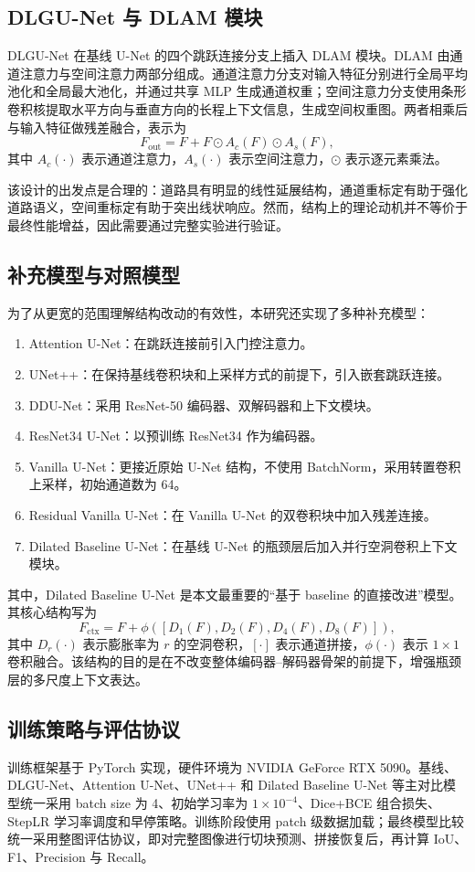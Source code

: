 \documentclass[12pt,a4paper]{ctexart}
\begin{document}
\subsection{DLGU-Net 与 DLAM 模块}
DLGU-Net 在基线 U-Net 的四个跳跃连接分支上插入 DLAM 模块。DLAM 由通道注意力与空间注意力两部分组成。通道注意力分支对输入特征分别进行全局平均池化和全局最大池化，并通过共享 MLP 生成通道权重；空间注意力分支使用条形卷积核提取水平方向与垂直方向的长程上下文信息，生成空间权重图。两者相乘后与输入特征做残差融合，表示为
\[
F_{\text{out}} = F + F \odot A_c(F) \odot A_s(F),
\]
其中 $A_c(\cdot)$ 表示通道注意力，$A_s(\cdot)$ 表示空间注意力，$\odot$ 表示逐元素乘法。

该设计的出发点是合理的：道路具有明显的线性延展结构，通道重标定有助于强化道路语义，空间重标定有助于突出线状响应。然而，结构上的理论动机并不等价于最终性能增益，因此需要通过完整实验进行验证。

\subsection{补充模型与对照模型}
为了从更宽的范围理解结构改动的有效性，本研究还实现了多种补充模型：
\begin{enumerate}
    \item Attention U-Net：在跳跃连接前引入门控注意力。
    \item UNet++：在保持基线卷积块和上采样方式的前提下，引入嵌套跳跃连接。
    \item DDU-Net：采用 ResNet-50 编码器、双解码器和上下文模块。
    \item ResNet34 U-Net：以预训练 ResNet34 作为编码器。
    \item Vanilla U-Net：更接近原始 U-Net 结构，不使用 BatchNorm，采用转置卷积上采样，初始通道数为 64。
    \item Residual Vanilla U-Net：在 Vanilla U-Net 的双卷积块中加入残差连接。
    \item Dilated Baseline U-Net：在基线 U-Net 的瓶颈层后加入并行空洞卷积上下文模块。
\end{enumerate}

其中，Dilated Baseline U-Net 是本文最重要的“基于 baseline 的直接改进”模型。其核心结构写为
\[
F_{\text{ctx}} = F + \phi([D_1(F), D_2(F), D_4(F), D_8(F)]),
\]
其中 $D_r(\cdot)$ 表示膨胀率为 $r$ 的空洞卷积，$[\cdot]$ 表示通道拼接，$\phi(\cdot)$ 表示 $1 \times 1$ 卷积融合。该结构的目的是在不改变整体编码器--解码器骨架的前提下，增强瓶颈层的多尺度上下文表达。

\subsection{训练策略与评估协议}
训练框架基于 PyTorch 实现，硬件环境为 NVIDIA GeForce RTX 5090。基线、DLGU-Net、Attention U-Net、UNet++ 和 Dilated Baseline U-Net 等主对比模型统一采用 batch size 为 4、初始学习率为 $1 \times 10^{-4}$、Dice+BCE 组合损失、StepLR 学习率调度和早停策略。训练阶段使用 patch 级数据加载；最终模型比较统一采用整图评估协议，即对完整图像进行切块预测、拼接恢复后，再计算 IoU、F1、Precision 与 Recall。
\end{document}
